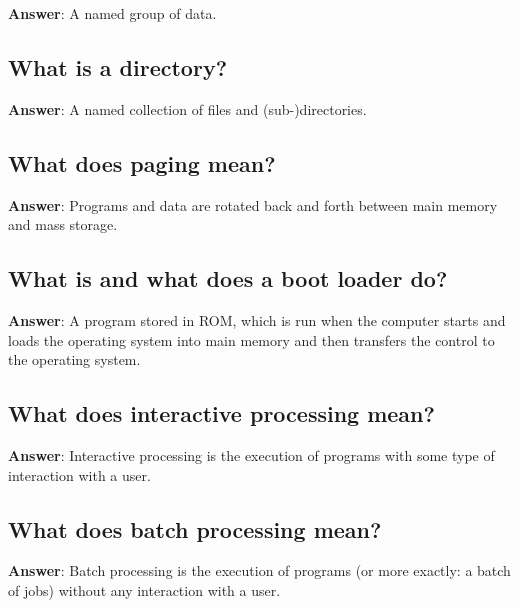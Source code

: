 \documentclass[a4paper,11pt,oneside]{article}
\begin{document}
\begin{sloppypar}
\label{q:122:sa:en:True}

\textbf{Answer}: A named group of data.



\subsection{What is a directory?}

\label{q:123:sa:en:True}

\textbf{Answer}: A named collection of files and (sub-)directories.



\subsection{What does paging mean?}

\label{q:124:sa:en:True}

\textbf{Answer}: Programs and data are rotated back and forth between main memory and mass storage.



\subsection{What is and what does a boot loader do?}

\label{q:125:sa:en:True}

\textbf{Answer}: A program stored in ROM, which is run when the computer starts and loads the operating system into main memory and then transfers the control to the operating system.



\subsection{What does interactive processing mean?}

\label{q:126:sa:en:True}

\textbf{Answer}: Interactive processing is the execution of programs with some type of interaction with a user.



\subsection{What does batch processing mean?}

\label{q:127:sa:en:True}

\textbf{Answer}: Batch processing is the execution of programs (or more exactly: a batch of jobs) without any interaction with a user.




\end{sloppypar}
\end{document}
